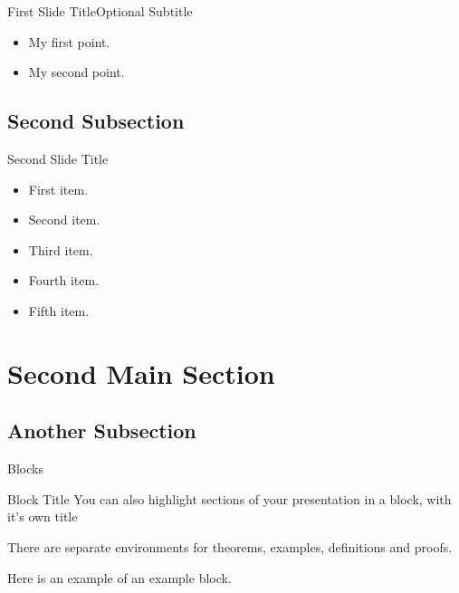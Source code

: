 \documentclass{beamer}
\begin{document}
\begin{frame}{First Slide Title}{Optional Subtitle}
  \begin{itemize}
  \item {
    My first point.
  }
  \item {
    My second point.
  }
  \end{itemize}
\end{frame}

\subsection{Second Subsection}

\begin{frame}{Second Slide Title}
  \begin{itemize}
  \item {
    First item.
    \pause %
  }
  \item {   
    Second item.
  }
  \item<3-> {
    Third item.
  }
  \item<4-> {
    Fourth item.
  }
  \item<5-> {
    Fifth item. 
  }
  \end{itemize}
\end{frame}

\section{Second Main Section}

\subsection{Another Subsection}

\begin{frame}{Blocks}
\begin{block}{Block Title}
You can also highlight sections of your presentation in a block, with it's own title
\end{block}
\begin{theorem}
There are separate environments for theorems, examples, definitions and proofs.
\end{theorem}
\begin{example}
Here is an example of an example block.
\end{example}
\end{frame}
\end{document}
